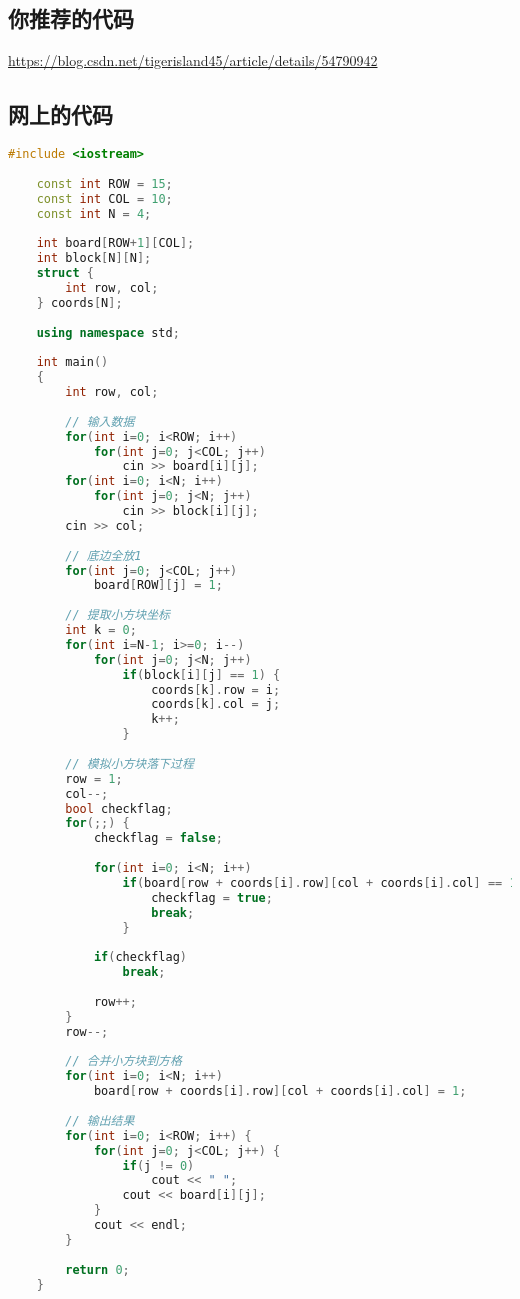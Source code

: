 \subsection{你推荐的代码}

\href{201604-2 俄罗斯方块}{https://blog.csdn.net/tigerisland45/article/details/54790942}

\subsection{网上的代码}
\begin{lstlisting}[language=C++]
    #include <iostream>
     
    const int ROW = 15;
    const int COL = 10;
    const int N = 4;
     
    int board[ROW+1][COL];
    int block[N][N];
    struct {
        int row, col;
    } coords[N];
     
    using namespace std;
     
    int main()
    {
        int row, col;
     
        // 输入数据
        for(int i=0; i<ROW; i++)
            for(int j=0; j<COL; j++)
                cin >> board[i][j];
        for(int i=0; i<N; i++)
            for(int j=0; j<N; j++)
                cin >> block[i][j];
        cin >> col;
     
        // 底边全放1
        for(int j=0; j<COL; j++)
            board[ROW][j] = 1;
     
        // 提取小方块坐标
        int k = 0;
        for(int i=N-1; i>=0; i--)
            for(int j=0; j<N; j++)
                if(block[i][j] == 1) {
                    coords[k].row = i;
                    coords[k].col = j;
                    k++;
                }
     
        // 模拟小方块落下过程
        row = 1;
        col--;
        bool checkflag;
        for(;;) {
            checkflag = false;
     
            for(int i=0; i<N; i++)
                if(board[row + coords[i].row][col + coords[i].col] == 1) {
                    checkflag = true;
                    break;
                }
     
            if(checkflag)
                break;
     
            row++;
        }
        row--;
     
        // 合并小方块到方格
        for(int i=0; i<N; i++)
            board[row + coords[i].row][col + coords[i].col] = 1;
     
        // 输出结果
        for(int i=0; i<ROW; i++) {
            for(int j=0; j<COL; j++) {
                if(j != 0)
                    cout << " ";
                cout << board[i][j];
            }
            cout << endl;
        }
     
        return 0;
    }
\end{lstlisting}